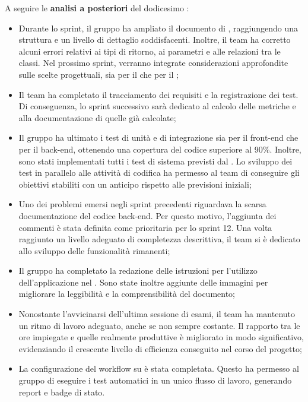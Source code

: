 \vspace{0.5\baselineskip}
\par A seguire le \textbf{analisi a posteriori} del dodicesimo :
\begin{itemize}
  \item Durante lo sprint, il gruppo ha ampliato il documento di \ST, raggiungendo una struttura e un livello di dettaglio soddisfacenti. Inoltre, il team ha corretto alcuni errori relativi ai tipi di ritorno, ai parametri e alle relazioni tra le classi. Nel prossimo sprint, verranno integrate considerazioni approfondite sulle scelte progettuali, sia per il  che per il ;
  \item Il team ha completato il tracciamento dei requisiti e la registrazione dei test. Di conseguenza, lo sprint successivo sarà dedicato al calcolo delle metriche e alla documentazione di quelle già calcolate;
  \item Il gruppo ha ultimato i test di unità e di integrazione sia per il front-end che per il back-end, ottenendo una copertura del codice superiore al 90\%. Inoltre, sono stati implementati tutti i test di sistema previsti dal \PdQ. Lo sviluppo dei test in parallelo alle attività di codifica ha permesso al team di conseguire gli obiettivi stabiliti con un anticipo rispetto alle previsioni iniziali;
  \item Uno dei problemi emersi negli sprint precedenti riguardava la scarsa documentazione del codice back-end. Per questo motivo, l'aggiunta dei commenti è stata definita come prioritaria per lo sprint 12. Una volta raggiunto un livello adeguato di completezza descrittiva, il team si è dedicato allo sviluppo delle funzionalità rimanenti;
  \item Il gruppo ha completato la redazione delle istruzioni per l'utilizzo dell'applicazione nel \MU. Sono state inoltre aggiunte delle immagini per migliorare la leggibilità e la comprensibilità del documento;
  \item Nonostante l'avvicinarsi dell'ultima sessione di esami, il team ha mantenuto un ritmo di lavoro adeguato, anche se non sempre costante. Il rapporto tra le ore impiegate e quelle realmente produttive è migliorato in modo significativo, evidenziando il crescente livello di efficienza conseguito nel corso del progetto;
  \item La configurazione del workflow su  è stata completata. Questo ha permesso al gruppo di eseguire i test automatici in un unico flusso di lavoro, generando report e badge di stato.
\end{itemize}

